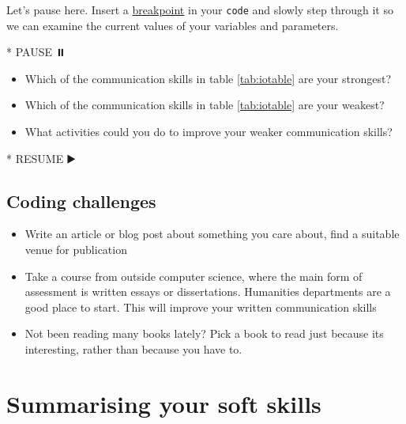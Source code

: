 \documentclass[
]{book}
\newenvironment{Shaded}{\begin{snugshade}}{\end{snugshade}}
\newcommand{\NormalTok}[1]{#1}
\newcommand{\SpecialStringTok}[1]{\textcolor[rgb]{0.31,0.60,0.02}{#1}}
\providecommand{\tightlist}{%
  \setlength{\itemsep}{0pt}\setlength{\parskip}{0pt}}
\begin{document}
Let's pause here. Insert a \href{https://en.wikipedia.org/wiki/Breakpoint}{breakpoint} in your \texttt{code} and slowly step through it so we can examine the current values of your variables and parameters.

\begin{Shaded}
\begin{Highlighting}[]
\SpecialStringTok{* }\NormalTok{PAUSE ⏸️}
\end{Highlighting}
\end{Shaded}

\begin{itemize}
\tightlist
\item
  Which of the communication skills in table \ref{tab:iotable} are your strongest?
\item
  Which of the communication skills in table \ref{tab:iotable} are your weakest?
\item
  What activities could you do to improve your weaker communication skills?
\end{itemize}

\begin{Shaded}
\begin{Highlighting}[]
\SpecialStringTok{* }\NormalTok{RESUME ▶️}
\end{Highlighting}
\end{Shaded}

\hypertarget{cc4}{%
\subsection{Coding challenges}\label{cc4}}

\begin{itemize}
\tightlist
\item
  Write an article or blog post about something you care about, find a suitable venue for publication
\item
  Take a course from outside computer science, where the main form of assessment is written essays or dissertations. Humanities departments are a good place to start. This will improve your written communication skills
\item
  Not been reading many books lately? Pick a book to read just because its interesting, rather than because you have to.
\end{itemize}

\hypertarget{tldr4}{%
\section{Summarising your soft skills}\label{tldr4}}
\end{document}
